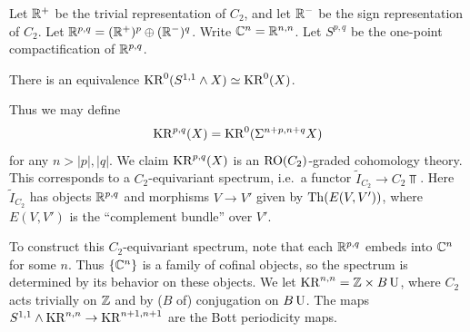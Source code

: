 \documentclass{article}
\begin{document}
\begin{notn}
  Let $\mathbb{R}^+$ be the trivial representation of $C_2$, and let $\mathbb{R}^-$ be the sign representation of $C_2$.
  Let $\mathbb{R}^{p,q} = (\mathbb{R}^+)^p \oplus (\mathbb{R}^-)^q$.
  Write $\mathbb{C}^n = \mathbb{R}^{n,n}$.
  Let $S^{p,q}$ be the one-point compactification of $\mathbb{R}^{p,q}$.
\end{notn}

\begin{thm}
  There is an equivalence $\mathrm{KR}^0(S^{1,1} \wedge X) \simeq \mathrm{KR}^0(X)$.
\end{thm}

Thus we may define
\[
  \mathrm{KR}^{p,q}(X) = \mathrm{KR}^0(\Sigma^{n+p,n+q} X)
\]
for any $n > |p|, |q|$.
We claim $\mathrm{KR}^{p,q}(X)$ is an $\operatorname{RO}(C_2)$-graded cohomology theory.
This corresponds to a $C_2$-equivariant spectrum, i.e.\ a functor $\tilde{I}_{C_2} \to C_2\Top$.
Here $\tilde{I}_{C_2}$ has objects $\mathbb{R}^{p,q}$ and morphisms $V \to V'$ given by $\mathrm{Th}(E(V, V'))$, where $E(V, V')$ is the ``complement bundle'' over $V'$.

To construct this $C_2$-equivariant spectrum, note that each $\mathbb{R}^{p,q}$ embeds into $\mathbb{C}^n$ for some $n$.
Thus $\{ \mathbb{C}^n \}$ is a family of cofinal objects, so the spectrum is determined by its behavior on these objects.
We let $\mathrm{KR}^{n,n} = \mathbb{Z} \times B\operatorname{U}$, where $C_2$ acts trivially on $\mathbb{Z}$ and by ($B$ of) conjugation on $B\operatorname{U}$.
The maps $S^{1,1} \wedge \mathrm{KR}^{n,n} \to \mathrm{KR}^{n+1,n+1}$ are the Bott periodicity maps.
\end{document}

